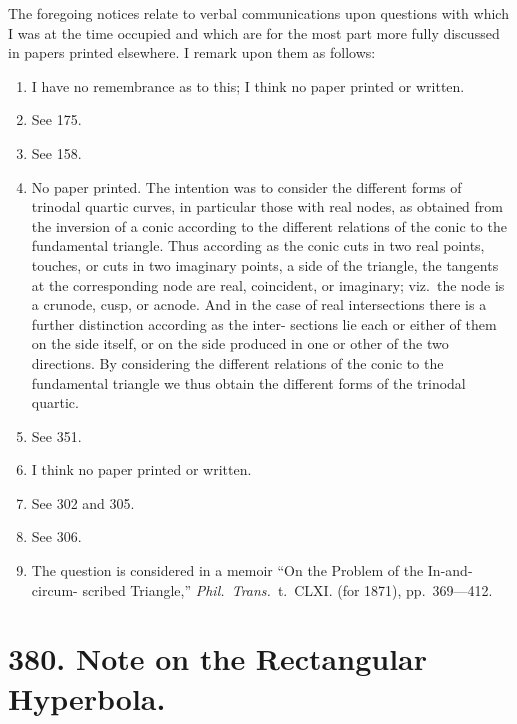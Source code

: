 \documentclass[11pt,a4paper]{article}
\begin{document}
\medskip

The foregoing notices relate to verbal communications upon questions with which
I was at the time occupied and which are for the most part more fully discussed in
papers printed elsewhere. I remark upon them as follows:

\begin{enumerate}
\item[1.] I have no remembrance as to this; I think no paper printed or written.

\item[2.] See 175.

\item[3.] See 158.

\item[4.] No paper printed. The intention was to consider the different forms of
trinodal quartic curves, in particular those with real nodes, as obtained from the
inversion of a conic according to the different relations of the conic to the fundamental
triangle. Thus according as the conic cuts in two real points, touches, or cuts in two
imaginary points, a side of the triangle, the tangents at the corresponding node are
real, coincident, or imaginary; viz.\ the node is a crunode, cusp, or acnode. And in
the case of real intersections there is a further distinction according as the inter-
sections lie each or either of them on the side itself, or on the side produced in
one or other of the two directions. By considering the different relations of the conic
to the fundamental triangle we thus obtain the different forms of the trinodal quartic.

\item[5.] See 351.

\item[6.] I think no paper printed or written.

\item[7.] See 302 and 305.

\item[8.] See 306.

\item[9.] The question is considered in a memoir ``On the Problem of the In-and-circum-
scribed Triangle,'' \textit{Phil.\ Trans.}\ t.\ CLXI. (for 1871), pp.\ 369---412.
\end{enumerate}

\newpage


\section*{380. Note on the Rectangular Hyperbola.}
\end{document}
